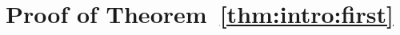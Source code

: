 \documentclass[11pt,letterpaper,reqno]{amsart}
\theoremstyle{definition}
\numberwithin{equation}{section}
\newcommand{\eps}{\varepsilon}
\newcommand{\1}{\mathbf{1}}
\begin{document}

\section{Proof of Theorem~\ref{thm:intro:first}}\label{sec:main1}
\end{document}

